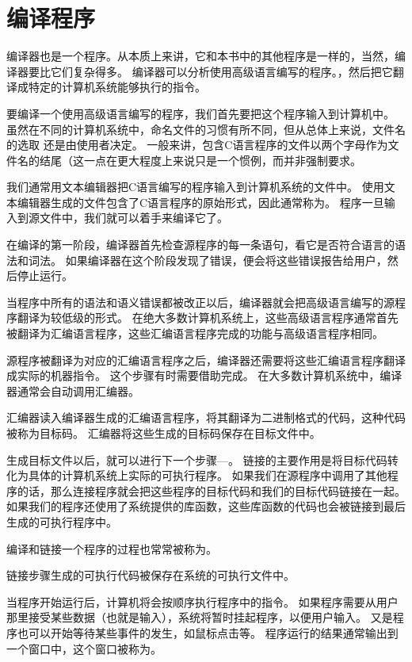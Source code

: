 \section{编译程序}
{
    编译器也是一个程序。从本质上来讲，它和本书中的其他程序是一样的，当然，编译器要比它们复杂得多。
    编译器可以分析使用高级语言编写的程序。，然后把它翻译成特定的计算机系统能够执行的指令。

    要编译一个使用高级语言编写的程序，我们首先要把这个程序输入到计算机中。
    虽然在不同的计算机系统中，命名文件的习惯有所不同，但从总体上来说，文件名的选取 还是由使用者决定。
    一般来讲，包含C语言程序的文件以两个字母作为文件名的结尾（这一点在更大程度上来说只是一个惯例，而并非强制要求。

    我们通常用文本编辑器把C语言编写的程序输入到计算机系统的文件中。
    使用文本编辑器生成的文件包含了C语言程序的原始形式，因此通常称为。
    程序一旦输入到源文件中，我们就可以着手来编译它了。

    在编译的第一阶段，编译器首先检查源程序的每一条语句，看它是否符合语言的语法和词法。
    如果编译器在这个阶段发现了错误，便会将这些错误报告给用户，然后停止运行。

    当程序中所有的语法和语义错误都被改正以后，编译器就会把高级语言编写的源程序翻译为较低级的形式。
    在绝大多数计算机系统上，这些高级语言程序通常首先被翻译为汇编语言程序，这些汇编语言程序完成的功能与高级语言程序相同。

    源程序被翻译为对应的汇编语言程序之后，编译器还需要将这些汇编语言程序翻译成实际的机器指令。
    这个步骤有时需要借助完成。
    在大多数计算机系统中，编译器通常会自动调用汇编器。

    汇编器读入编译器生成的汇编语言程序，将其翻译为二进制格式的代码，这种代码被称为目标码。
    汇编器将这些生成的目标码保存在目标文件中。

    生成目标文件以后，就可以进行下一个步骤---。
    链接的主要作用是将目标代码转化为具体的计算机系统上实际的可执行程序。
    如果我们在源程序中调用了其他程序的话，那么连接程序就会把这些程序的目标代码和我们的目标代码链接在一起。
    如果我们的程序还使用了系统提供的库函数，这些库函数的代码也会被链接到最后生成的可执行程序中。

    编译和链接一个程序的过程也常常被称为。

    链接步骤生成的可执行代码被保存在系统的可执行文件中。

    当程序开始运行后，计算机将会按顺序执行程序中的指令。
    如果程序需要从用户那里接受某些数据（也就是输入），系统将暂时挂起程序，以便用户输入。
    又是程序也可以开始等待某些事件的发生，如鼠标点击等。
    程序运行的结果通常输出到一个窗口中，这个窗口被称为。
}

\endinput

